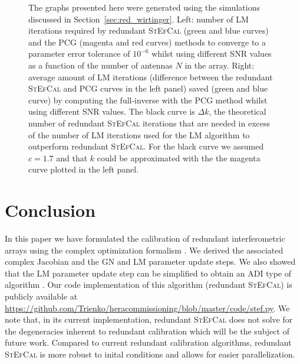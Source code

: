 \documentclass[useAMS,usenatbib]{mn2e}
\begin{document}
\begin{figure}
\centering
{}
\caption{The graphs presented here were generated using the simulations discussed in Section~\ref{sec:red_wirtinger}. Left: number of LM iterations required by redundant \textsc{StEfCal} (green and blue curves) and the PCG (magenta and red curves) methods to converge to a parameter error tolerance of $10^{-6}$ whilst using different SNR values as a function of the number of antennas $N$ in the array. Right: average amount of LM iterations (difference between the redundant \textsc{StEfCal} and PCG curves in the left panel) saved (green and blue curve) by computing the full-inverse with the PCG method whilst using different SNR values. The black curve is $\Delta k$, the theoretical number 
of redundant \textsc{StEfCal} iterations that are needed in excess of the number of LM iterations used for the LM algorithm to 
outperform redundant \textsc{StEfCal}. For the black curve we assumed $c=1.7$ and that $k$ could be approximated with the 
the magenta curve plotted in the left panel.
\label{fig:out_diff}} 
\end{figure}


\section{Conclusion}
\label{sec:conclusions}
In this paper we have formulated the calibration of redundant interferometric arrays using the complex optimization formalism 
\citep{Smirnov2015}. We derived the associated complex Jacobian and the GN and LM parameter update steps.
We also showed that the LM parameter update step can be simplified to obtain an ADI type of algorithm \citep[][]{Salvini2014,Marthi2014}.
Our code implementation of this algorithm (redundant \textsc{StEfCal}) is publicly available at 
\url{https://github.com/Trienko/heracommissioning/blob/master/code/stef.py}. 
We note that, in its current implementation, redundant \textsc{StEfCal} does not solve for the degeneracies inherent to redundant calibration  \citep{Zheng2014,Kurien2016} which will be the subject of future work. Compared to current redundant calibration algorithms, redundant \textsc{StEfCal} is more robust to inital conditions and allows for easier parallelization. 
\end{document}
